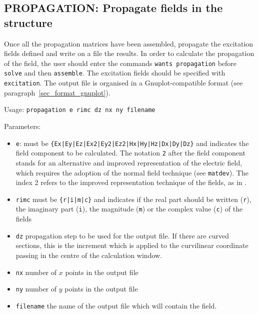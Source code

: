 \subsection{PROPAGATION: Propagate fields in the structure}
    Once all the propagation matrices have been assembled,
    propagate the excitation fields defined and write on a file the results.
    In order to calculate the propagation of the field, the user should enter
    the commands \lstinline!wants propagation! before \lstinline!solve! and then \lstinline!assemble!. The excitation fields should be specified with \lstinline!excitation!.
    The output file is organised in a Gnuplot-compatible format (see paragraph~\ref{sec_format_gnuplot}). 

    Usage: \lstinline!propagation e rimc dz nx ny filename!
    
    Parameters:
    \begin{itemize}
    \item\lstinline!e!: must be \lstinline!{Ex|Ey|Ez|Ex2|Ey2|Ez2|Hx|Hy|Hz|Dx|Dy|Dz}! and indicates the field component to be calculated. The notation \lstinline!2! after the field component stands for an alternative and improved representation of the electric field, which requires the adoption of the normal field technique (see \lstinline!matdev!). The index 2 refers to the improved representation technique of the fields, as in \cite{lalanne1998computation}.

    \item\lstinline!rimc!    must be \lstinline!{r|i|m|c}! and indicates if  the real part should be written
            (\lstinline!r!), the imaginary part (\lstinline!i!), the magnitude (\lstinline!m!) or the complex 
            value (\lstinline!c!) of the fields

    \item\lstinline!dz! propagation step to be used for the output file. If there are curved sections, this is the increment which is applied to the curvilinear coordinate passing in the centre of the calculation window. 
    
    \item\lstinline!nx! number of $x$ points in the output file

    \item\lstinline!ny! number of $y$ points in the output file

    \item\lstinline!filename! the name of the output file which will contain the field.
    \end{itemize}
